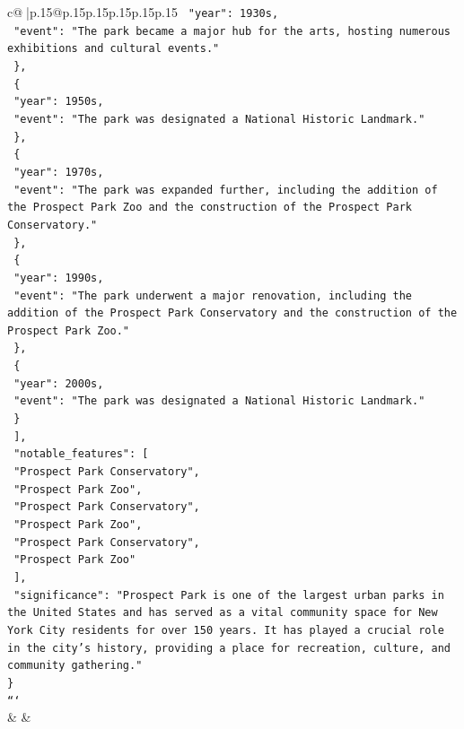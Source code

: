 \documentclass{article}
\begin{document}
{\begin{supertabular}{c@{$\;$}|p{.15\linewidth}@{}p{.15\linewidth}p{.15\linewidth}p{.15\linewidth}p{.15\linewidth}p{.15\linewidth}}
{{{\texttt{      "year": 1930s,} \\
\texttt{      "event": "The park became a major hub for the arts, hosting numerous exhibitions and cultural events."} \\
\texttt{    \},} \\
\texttt{    \{} \\
\texttt{      "year": 1950s,} \\
\texttt{      "event": "The park was designated a National Historic Landmark."} \\
\texttt{    \},} \\
\texttt{    \{} \\
\texttt{      "year": 1970s,} \\
\texttt{      "event": "The park was expanded further, including the addition of the Prospect Park Zoo and the construction of the Prospect Park Conservatory."} \\
\texttt{    \},} \\
\texttt{    \{} \\
\texttt{      "year": 1990s,} \\
\texttt{      "event": "The park underwent a major renovation, including the addition of the Prospect Park Conservatory and the construction of the Prospect Park Zoo."} \\
\texttt{    \},} \\
\texttt{    \{} \\
\texttt{      "year": 2000s,} \\
\texttt{      "event": "The park was designated a National Historic Landmark."} \\
\texttt{    \}} \\
\texttt{  {]},} \\
\texttt{  "notable\_features": {[}} \\
\texttt{    "Prospect Park Conservatory",} \\
\texttt{    "Prospect Park Zoo",} \\
\texttt{    "Prospect Park Conservatory",} \\
\texttt{    "Prospect Park Zoo",} \\
\texttt{    "Prospect Park Conservatory",} \\
\texttt{    "Prospect Park Zoo"} \\
\texttt{  {]},} \\
\texttt{  "significance": "Prospect Park is one of the largest urban parks in the United States and has served as a vital community space for New York City residents for over 150 years. It has played a crucial role in the city's history, providing a place for recreation, culture, and community gathering."} \\
\texttt{\}} \\
\texttt{```} \\
            }
        }
    }
    & & \\ \\


\end{supertabular}}
\end{document}
